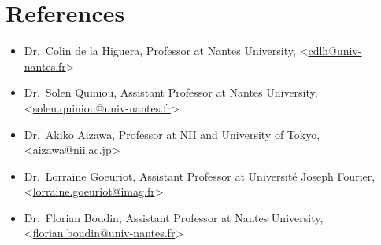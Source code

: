 \documentclass[11pt,a4paper,sans]{moderncv}        %
\begin{document}
\section{References}
\begin{itemize}
\item Dr.~Colin de la Higuera, Professor at Nantes University,
  <\href{mailto:cdlh@univ-nantes.fr}{cdlh@univ-nantes.fr}>
\item Dr.~Solen Quiniou, Assistant Professor at Nantes University,
  <\href{mailto:solen.quiniou@univ-nantes.fr}{solen.quiniou@univ-nantes.fr}>
\item Dr.~Akiko Aizawa, Professor at NII and University of Tokyo,
  <\href{mailto:aizawa@nii.ac.jp}{aizawa@nii.ac.jp}>
\item Dr.~Lorraine Goeuriot, Assistant Professor at Université Joseph
  Fourier,
  <\href{mailto:lorraine.goeuriot@imag.fr}{lorraine.goeuriot@imag.fr}>
\item Dr.~Florian Boudin, Assistant Professor at Nantes University,
  <\href{mailto:florian.boudin@univ-nantes.fr}{florian.boudin@univ-nantes.fr}>
\end{itemize}




\end{document}
